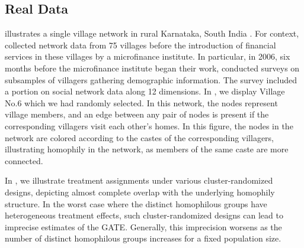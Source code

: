 \documentclass[12pt]{article}
\theoremstyle{definition}
\numberwithin{equation}{section}
\numberwithin{figure}{section}
\numberwithin{equation}{section}
\numberwithin{figure}{section}
\begin{document}
\subsection{Real Data} \label{section_read_data}

 illustrates a single village network in rural Karnataka, South India \citep{banerjee2013diffusion,DVN/U3BIHX_2013}. For context, \citet{banerjee2013diffusion} collected network data from 75 villages before the introduction of financial services in these villages by a microfinance institute. 
In particular, in 2006, six months before the microfinance institute began their work, \citet{banerjee2013diffusion} conducted surveys on subsamples of villagers gathering demographic information. The survey included a portion on social network data along 12 dimensions. In , we display Village No.6 which we had randomly selected. In this network, the nodes represent village members, and an edge between any pair of nodes is present if the corresponding villagers visit each other's homes. In this figure, the nodes in the network are colored according to the castes of the corresponding villagers, illustrating homophily in the network, as members of the same caste are more connected.

In , we illustrate treatment assignments under various cluster-randomized designs, depicting almost complete overlap with the underlying homophily structure. In the worst case where the distinct homophilous groups have heterogeneous treatment effects, such cluster-randomized designs can lead to imprecise estimates of the GATE. Generally, this imprecision worsens as the number of distinct homophilous groups increases for a fixed population size.


\end{document}
